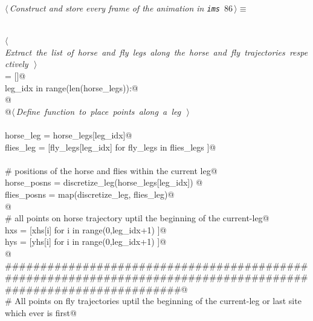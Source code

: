 \documentclass[11.5pt]{report}
\begin{document}
\begin{flushleft} \small
\begin{minipage}{\linewidth}\label{scrap137}\raggedright\small
{} $\langle\,${\itshape Construct and store every frame of the animation in \verb|ims|}\nobreak\ {\footnotesize {86}}$\,\rangle\equiv$
\vspace{-1ex}
\begin{list}{}{} \item
\mbox{}\verb@@\\
\mbox{}\verb@@\hbox{$\langle\,${\itshape Extract the list of horse and fly legs along the horse and fly trajectories respectively}\nobreak\ {\footnotesize {}}$\,\rangle$}\verb@@\\
\mbox{}\verb@ims = []@\\
\mbox{}\verb@for leg_idx in range(len(horse_legs)):@\\
\mbox{}\verb@    @\\
\mbox{}\verb@     @\hbox{$\langle\,${\itshape Define function to place points along a leg}\nobreak\ {\footnotesize {}}$\,\rangle$}\verb@@\\
\mbox{}\verb@@\\
\mbox{}\verb@     horse_leg = horse_legs[leg_idx]@\\
\mbox{}\verb@     flies_leg = [fly_legs[leg_idx] for fly_legs in flies_legs   ]@\\
\mbox{}\verb@@\\
\mbox{}\verb@     # positions of the horse and flies within the current leg@\\
\mbox{}\verb@     horse_posns = discretize_leg(horse_legs[leg_idx]) @\\
\mbox{}\verb@     flies_posns = map(discretize_leg, flies_leg)@\\
\mbox{}\verb@     @\\
\mbox{}\verb@     # all points on horse trajectory uptil the beginning of the current-leg@\\
\mbox{}\verb@     hxs = [xhs[i] for i in range(0,leg_idx+1) ]@\\
\mbox{}\verb@     hys = [yhs[i] for i in range(0,leg_idx+1) ]@\\
\mbox{}\verb@ @\\
\mbox{}\verb@     ###############################################################################################################@\\
\mbox{}\verb@     # All points on fly trajectories uptil the beginning of the current-leg or last site which ever is first@\\

\end{list}
\end{minipage}
\end{flushleft}
\end{document}
